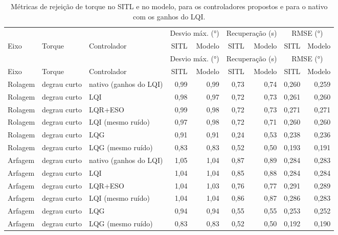 \begin{longtable}{lllrrrrrr}
\caption{Métricas de rejeição de torque no SITL e no modelo, para os controladores propostos e para o nativo com os ganhos do LQI.}\label{tab:validacao-proposto} \\
\toprule
 & & & \multicolumn{2}{c}{Desvio máx. (\si{\degree})} & \multicolumn{2}{c}{Recuperação (\si{\second})} & \multicolumn{2}{c}{RMSE (\si{\degree})} \\
\cmidrule(lr){4-5}\cmidrule(lr){6-7}\cmidrule(lr){8-9}
Eixo & Torque & Controlador & SITL & Modelo & SITL & Modelo & SITL & Modelo \\
\midrule
\endfirsthead
\toprule
 & & & \multicolumn{2}{c}{Desvio máx. (\si{\degree})} & \multicolumn{2}{c}{Recuperação (\si{\second})} & \multicolumn{2}{c}{RMSE (\si{\degree})} \\
\cmidrule(lr){4-5}\cmidrule(lr){6-7}\cmidrule(lr){8-9}
Eixo & Torque & Controlador & SITL & Modelo & SITL & Modelo & SITL & Modelo \\
\midrule
\endhead
\bottomrule
\endlastfoot
Rolagem & degrau curto & nativo (ganhos do LQI) & 0,99 & 0,99 & 0,73 & 0,74 & 0,260 & 0,259 \\
Rolagem & degrau curto & LQI & 0,98 & 0,97 & 0,72 & 0,73 & 0,261 & 0,260 \\
Rolagem & degrau curto & LQR+ESO & 0,99 & 0,98 & 0,72 & 0,73 & 0,271 & 0,271 \\
Rolagem & degrau curto & LQI (mesmo ruído) & 0,97 & 0,98 & 0,72 & 0,71 & 0,260 & 0,260 \\
Rolagem & degrau curto & LQG & 0,91 & 0,91 & 0,24 & 0,53 & 0,238 & 0,236 \\
Rolagem & degrau curto & LQG (mesmo ruído) & 0,83 & 0,83 & 0,52 & 0,50 & 0,193 & 0,191 \\
Arfagem & degrau curto & nativo (ganhos do LQI) & 1,05 & 1,04 & 0,87 & 0,89 & 0,284 & 0,283 \\
Arfagem & degrau curto & LQI & 1,04 & 1,04 & 0,85 & 0,88 & 0,284 & 0,284 \\
Arfagem & degrau curto & LQR+ESO & 1,04 & 1,03 & 0,76 & 0,77 & 0,291 & 0,289 \\
Arfagem & degrau curto & LQI (mesmo ruído) & 1,04 & 1,04 & 0,86 & 0,87 & 0,286 & 0,283 \\
Arfagem & degrau curto & LQG & 0,94 & 0,94 & 0,55 & 0,55 & 0,253 & 0,252 \\
Arfagem & degrau curto & LQG (mesmo ruído) & 0,83 & 0,83 & 0,52 & 0,50 & 0,192 & 0,190 \\

\end{longtable}

